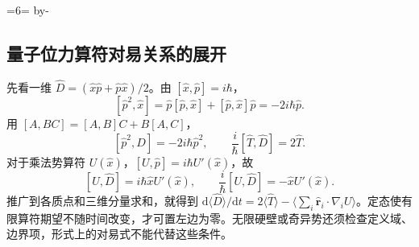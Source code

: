 \documentclass[UTF8,zihao=-4,fontset=fandol,a4paper]{ctexart}
\makeatletter
\newcommand{\vect}[1]{\bm{#1}}
\newcommand{\dd}{\mathrm d}
\newcommand{\Needspace}[1]{\par\if@nobreak\else\penalty0\begingroup\dimen0=#1\relax\dimen2=\pagegoal\advance\dimen2 by-\pagetotal\ifdim\dimen0>\dimen2\newpage\fi\endgroup\fi}
\let\SavedSubsection\subsection
\renewcommand{\subsection}{\Needspace{6\baselineskip}\SavedSubsection}
\makeatother
\begin{document}
\subsection{量子位力算符对易关系的展开}\label{sub:c2-8.8}\label{topic:quantumvirdetail}
先看一维 $\hat D=(\hat x\hat p+\hat p\hat x)/2$。由 $[\hat x,\hat p]=i\hbar$，
\[
[\hat p^2,\hat x]=\hat p[\hat p,\hat x]+[\hat p,\hat x]\hat p
=-2i\hbar\hat p.
\]
用 $[A,BC]=[A,B]C+B[A,C]$，
\[
[\hat p^2,\hat D]=-2i\hbar\hat p^2,
\qquad \frac i\hbar[\hat T,\hat D]=2\hat T.
\]
对于乘法势算符 $U(\hat x)$，$[U,\hat p]=i\hbar U'(\hat x)$，故
\[
[U,\hat D]=i\hbar\hat x U'(\hat x),\qquad
\frac i\hbar[U,\hat D]=-\hat xU'(\hat x).
\]
推广到各质点和三维分量求和，就得到
$\dd\langle\hat D\rangle/\dd t=2\langle\hat T\rangle-
\langle\sum_i\hat{\vect r}_i\cdot\nabla_iU\rangle$。定态使有限算符期望不随时间改变，才可置左边为零。无限硬壁或奇异势还须检查定义域、边界项，形式上的对易式不能代替这些条件。

\clearpage
\end{document}
